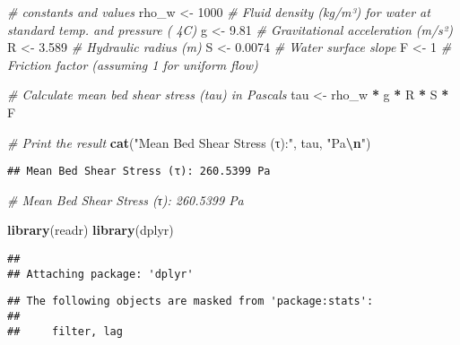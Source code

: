 \documentclass[
]{article}
\newenvironment{Shaded}{\begin{snugshade}}{\end{snugshade}}
\newcommand{\CommentTok}[1]{\textcolor[rgb]{0.56,0.35,0.01}{\textit{#1}}}
\newcommand{\DecValTok}[1]{\textcolor[rgb]{0.00,0.00,0.81}{#1}}
\newcommand{\FloatTok}[1]{\textcolor[rgb]{0.00,0.00,0.81}{#1}}
\newcommand{\FunctionTok}[1]{\textcolor[rgb]{0.13,0.29,0.53}{\textbf{#1}}}
\newcommand{\NormalTok}[1]{#1}
\newcommand{\OtherTok}[1]{\textcolor[rgb]{0.56,0.35,0.01}{#1}}
\newcommand{\SpecialCharTok}[1]{\textcolor[rgb]{0.81,0.36,0.00}{\textbf{#1}}}
\newcommand{\StringTok}[1]{\textcolor[rgb]{0.31,0.60,0.02}{#1}}
\begin{document}
\begin{Shaded}
\begin{Highlighting}[]
\CommentTok{\# constants and values}
\NormalTok{rho\_w }\OtherTok{\textless{}{-}} \DecValTok{1000}  \CommentTok{\# Fluid density (kg/m³) for water at standard temp. and pressure ( 4C)}
\NormalTok{g }\OtherTok{\textless{}{-}} \FloatTok{9.81}      \CommentTok{\# Gravitational acceleration (m/s²)}
\NormalTok{R }\OtherTok{\textless{}{-}} \FloatTok{3.589}     \CommentTok{\# Hydraulic radius (m)}
\NormalTok{S }\OtherTok{\textless{}{-}} \FloatTok{0.0074}    \CommentTok{\# Water surface slope}
\NormalTok{F }\OtherTok{\textless{}{-}} \DecValTok{1}         \CommentTok{\# Friction factor (assuming 1 for uniform flow)}

\CommentTok{\# Calculate mean bed shear stress (tau) in Pascals}
\NormalTok{tau }\OtherTok{\textless{}{-}}\NormalTok{ rho\_w }\SpecialCharTok{*}\NormalTok{ g }\SpecialCharTok{*}\NormalTok{ R }\SpecialCharTok{*}\NormalTok{ S }\SpecialCharTok{*}\NormalTok{ F}

\CommentTok{\# Print the result}
\FunctionTok{cat}\NormalTok{(}\StringTok{"Mean Bed Shear Stress (τ):"}\NormalTok{, tau, }\StringTok{"Pa}\SpecialCharTok{\textbackslash{}n}\StringTok{"}\NormalTok{)}
\end{Highlighting}
\end{Shaded}

\begin{verbatim}
## Mean Bed Shear Stress (τ): 260.5399 Pa
\end{verbatim}

\begin{Shaded}
\begin{Highlighting}[]
\CommentTok{\# Mean Bed Shear Stress (τ): 260.5399 Pa}
\end{Highlighting}
\end{Shaded}

\begin{Shaded}
\begin{Highlighting}[]
\FunctionTok{library}\NormalTok{(readr)}
\FunctionTok{library}\NormalTok{(dplyr)}
\end{Highlighting}
\end{Shaded}

\begin{verbatim}
## 
## Attaching package: 'dplyr'
\end{verbatim}

\begin{verbatim}
## The following objects are masked from 'package:stats':
## 
##     filter, lag
\end{verbatim}
\end{document}
